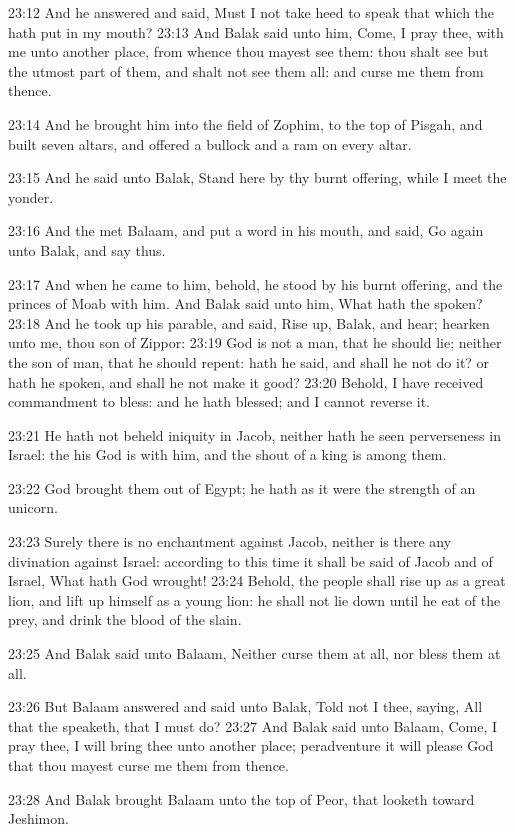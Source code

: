 23:12 And he answered and said, Must I not take heed to speak that
which the \LORD hath put in my mouth?  23:13 And Balak said unto him,
Come, I pray thee, with me unto another place, from whence thou mayest
see them: thou shalt see but the utmost part of them, and shalt not
see them all: and curse me them from thence.

23:14 And he brought him into the field of Zophim, to the top of
Pisgah, and built seven altars, and offered a bullock and a ram on
every altar.

23:15 And he said unto Balak, Stand here by thy burnt offering, while
I meet the \LORD yonder.

23:16 And the \LORD met Balaam, and put a word in his mouth, and said,
Go again unto Balak, and say thus.

23:17 And when he came to him, behold, he stood by his burnt offering,
and the princes of Moab with him. And Balak said unto him, What hath
the \LORD spoken?  23:18 And he took up his parable, and said, Rise up,
Balak, and hear; hearken unto me, thou son of Zippor: 23:19 God is not
a man, that he should lie; neither the son of man, that he should
repent: hath he said, and shall he not do it? or hath he spoken, and
shall he not make it good?  23:20 Behold, I have received commandment
to bless: and he hath blessed; and I cannot reverse it.

23:21 He hath not beheld iniquity in Jacob, neither hath he seen
perverseness in Israel: the \LORD his God is with him, and the shout of
a king is among them.

23:22 God brought them out of Egypt; he hath as it were the strength
of an unicorn.

23:23 Surely there is no enchantment against Jacob, neither is there
any divination against Israel: according to this time it shall be said
of Jacob and of Israel, What hath God wrought!  23:24 Behold, the
people shall rise up as a great lion, and lift up himself as a young
lion: he shall not lie down until he eat of the prey, and drink the
blood of the slain.

23:25 And Balak said unto Balaam, Neither curse them at all, nor bless
them at all.

23:26 But Balaam answered and said unto Balak, Told not I thee,
saying, All that the \LORD speaketh, that I must do?  23:27 And Balak
said unto Balaam, Come, I pray thee, I will bring thee unto another
place; peradventure it will please God that thou mayest curse me them
from thence.

23:28 And Balak brought Balaam unto the top of Peor, that looketh
toward Jeshimon.

